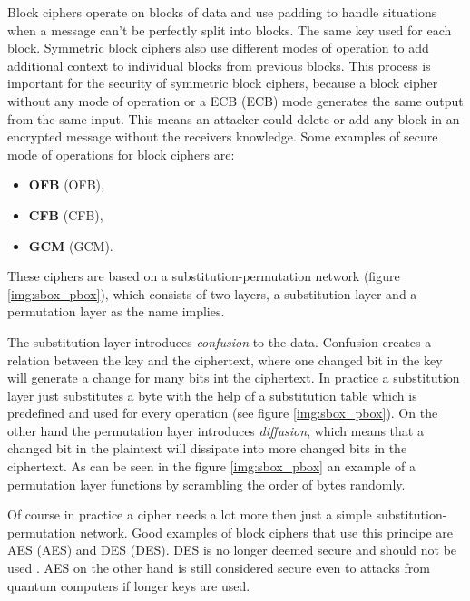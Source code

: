 Block ciphers operate on blocks of data and use padding to handle situations when a message can't be perfectly split into blocks. The same key used for each block. Symmetric block ciphers also use different modes of operation to add additional context to individual blocks from previous blocks. This process is important for the security of symmetric block ciphers, because a block cipher without any mode of operation or a ECB (\acl{ECB}) mode generates the same output from the same input. This means an attacker could delete or add any block in an encrypted message without the receivers knowledge. Some examples of secure mode of operations for block ciphers are:
\begin{itemize}
  \item \textbf{OFB} (\acl{OFB}),
  \item \textbf{CFB} (\acl{CFB}),
  \item \textbf{GCM} (\acl{GCM}).
\end{itemize}

These ciphers are based on a substitution-permutation network (figure \ref{img:sbox_pbox}), which consists of two layers, a substitution layer and a permutation layer as the name implies. 

The substitution layer introduces \textit{confusion} to the data. Confusion creates a relation between the key and the ciphertext, where one changed bit in the key will generate a change for many bits int the ciphertext. In practice a substitution layer just substitutes a byte with the help of a substitution table which is predefined and used for every operation (see figure \ref{img:sbox_pbox}). On the other hand the permutation layer introduces \textit{diffusion}, which means that a changed bit in the plaintext will dissipate into more changed bits in the ciphertext. As can be seen in the figure \ref{img:sbox_pbox} an example of a permutation layer functions by scrambling the order of bytes randomly. \cite{Paar2010}\cite{Shannon1949}

Of course in practice a cipher needs a lot more then just a simple substitution-permutation network. Good examples of block ciphers that use this principe are AES (\acl{AES}) and DES (\acl{DES}). DES is no longer deemed secure and should not be used \cite{Barker2017}. AES on the other hand is still considered secure even to attacks from quantum computers if longer keys are used\cite{Chen2016}.

